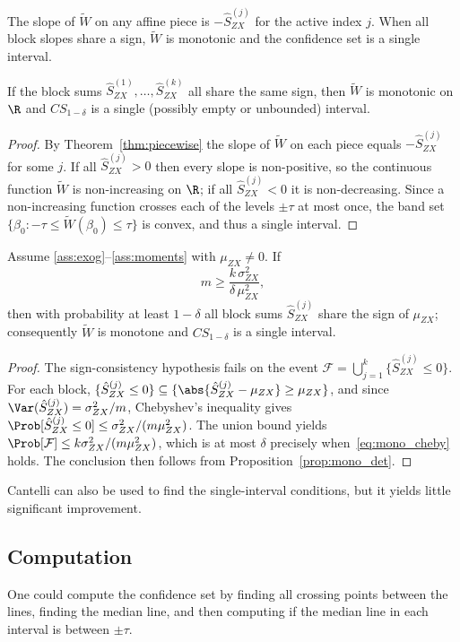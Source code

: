 The slope of $\widetilde{W}$ on any affine piece is $-\hat{S}_{ZX}^{(j)}$ for the active index $j$. When all block slopes share a sign, $\widetilde{W}$ is monotonic and the confidence set is a single interval.

\begin{proposition}
\label{prop:mono_det}
If the block sums $\hat{S}_{ZX}^{(1)},\dots,\hat{S}_{ZX}^{(k)}$ all share the same sign, then $\widetilde{W}$ is monotonic on $\R$ and $CS_{1-\delta}$ is a single (possibly empty or unbounded) interval.
\end{proposition}

\begin{proof}
By Theorem~\ref{thm:piecewise} the slope of $\widetilde{W}$ on each piece equals
$-\hat{S}_{ZX}^{(j)}$ for some $j$. If all $\hat{S}_{ZX}^{(j)}>0$ then every slope is non-positive, so the continuous function $\widetilde{W}$ is non-increasing on $\R$; if all $\hat{S}_{ZX}^{(j)}<0$ it is non-decreasing. Since a non-increasing function crosses each of the levels $\pm \tau$ at most once, the band set $\{\beta_0 : -\tau \leq \widetilde{W}(\beta_0) \leq \tau\}$ is convex, and thus a single interval.
\end{proof}

\begin{proposition}
\label{prop:mono_cheby}
Assume \ref{ass:exog}--\ref{ass:moments} with $\mu_{ZX}\neq 0$. If
\begin{equation}
  m \ge \frac{k\,\sigma_{ZX}^2}{\delta\,\mu_{ZX}^2},
  \label{eq:mono_cheby}
\end{equation}
then with probability at least $1-\delta$ all block sums $\hat{S}_{ZX}^{(j)}$
share the sign of $\mu_{ZX}$; consequently $\widetilde{W}$ is monotone and
$CS_{1-\delta}$ is a single interval.
\end{proposition}
 
\begin{proof}
The sign-consistency hypothesis fails on the event $\mathcal{F}=\bigcup_{j=1}^k\{\hat{S}_{ZX}^{(j)}\le 0\}$. For each block, $\{\hat{S}_{ZX}^{(j)}\le 0\}\subseteq
 \{\abs{\hat{S}_{ZX}^{(j)}-\mu_{ZX}}\ge\mu_{ZX}\}$, and since $\Var(\hat{S}_{ZX}^{(j)})=\sigma_{ZX}^2/m$, Chebyshev's inequality gives $\Prob[\hat{S}_{ZX}^{(j)}\le 0]\le \sigma_{ZX}^2/(m\mu_{ZX}^2)$. The union bound yields $\Prob[\mathcal{F}]\le k\sigma_{ZX}^2/(m\mu_{ZX}^2)$, which is at most $\delta$ precisely when~\eqref{eq:mono_cheby} holds. The conclusion then follows from Proposition~\ref{prop:mono_det}.
\end{proof}
Cantelli can also be used to find the single-interval conditions, but it yields little significant improvement.

\subsection{Computation}
One could compute the confidence set by finding all crossing points between the lines, finding the median line, and then computing if the median line in each interval is between $\pm \tau$.
